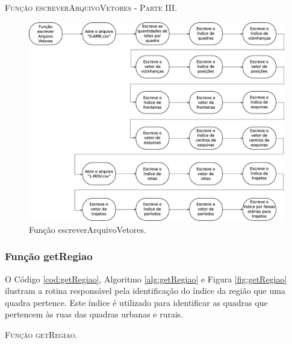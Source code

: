 \newpage 

\begin{algorithm}[H]
   \SetAlgoLined   
   
   \caption{\textsc{Função escreverArquivoVetores - Parte III.}}
   \label{alg:escreverArquivoVetores3}
\end{algorithm}

\begin{figure}[H]
  \centering
  \includegraphics[width=1\textwidth]{Figuras/Simula/Fluxos/escreverArquivoVetores.eps}
  \caption{Função escreverArquivoVetores.}
  \label{fig:escreverArquivoVetores}
\end{figure} 

\newpage

\subsubsection{Função getRegiao}

O Código \ref{cod:getRegiao}, Algoritmo \ref{alg:getRegiao} e Figura \ref{fig:getRegiao} ilustram a rotina responsável pela identificação do índice da região que uma quadra pertence. Este índice é utilizado para identificar as quadras que pertencem às ruas das quadras urbanas e rurais.  



\begin{algorithm}[H]
   \SetAlgoLined   
   
   \caption{\textsc{Função getRegiao.}}
   \label{alg:getRegiao}
\end{algorithm}


